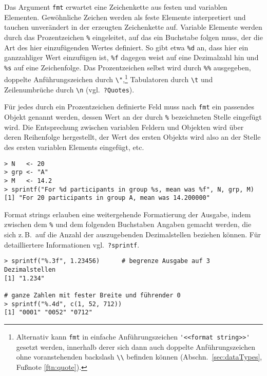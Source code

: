 Das Argument \lstinline!fmt! erwartet eine Zeichenkette aus festen und variablen Elementen. Gewöhnliche Zeichen werden als feste Elemente interpretiert und tauchen unverändert in der erzeugten Zeichenkette auf. Variable Elemente werden durch das Prozentzeichen \lstinline!%! eingeleitet, auf das ein Buchstabe folgen muss, der die Art des hier einzufügenden Wertes definiert. So gibt etwa \lstinline!%d! an, dass hier ein ganzzahliger Wert einzufügen ist, \lstinline!%f! dagegen weist auf eine Dezimalzahl hin und \lstinline!%s! auf eine Zeichenfolge. Das Prozentzeichen selbst wird durch \lstinline!%%! ausgegeben, doppelte Anführungszeichen durch \lstinline!\"!,\footnote{Alternativ kann \lstinline!fmt! in einfache Anführungszeichen \lstinline!'<<format string>>'! gesetzt werden, innerhalb derer sich dann auch doppelte Anführungszeichen ohne voranstehenden backslash \lstinline!\\! befinden können (Abschn.\ \ref{sec:dataTypes}, Fußnote \ref{ftn:quote}).} Tabulatoren durch \lstinline!\t! und Zeilenumbrüche durch \lstinline!\n! (vgl.\ \lstinline!?Quotes!).

Für jedes durch ein Prozentzeichen definierte Feld muss nach \lstinline!fmt! ein passendes Objekt genannt werden, dessen Wert an der durch \lstinline!%! bezeichneten Stelle eingefügt wird. Die Entsprechung zwischen variablen Feldern und Objekten wird über deren Reihenfolge hergestellt, der Wert des ersten Objekts wird also an der Stelle des ersten variablen Elements eingefügt, etc.
\begin{lstlisting}
> N   <- 20
> grp <- "A"
> M   <- 14.2
> sprintf("For %d participants in group %s, mean was %f", N, grp, M)
[1] "For 20 participants in group A, mean was 14.200000"
\end{lstlisting}

Format strings erlauben eine weitergehende Formatierung der Ausgabe, indem zwischen dem \lstinline!%! und dem folgenden Buchstaben Angaben gemacht werden, die sich z.\,B.\ auf die Anzahl der auszugebenden Dezimalstellen beziehen können. Für detailliertere Informationen vgl.\ \lstinline!?sprintf!.
\begin{lstlisting}
> sprintf("%.3f", 1.23456)      # begrenze Ausgabe auf 3 Dezimalstellen
[1] "1.234"

# ganze Zahlen mit fester Breite und führender 0
> sprintf("%.4d", c(1, 52, 712))
[1] "0001" "0052" "0712"
\end{lstlisting}

